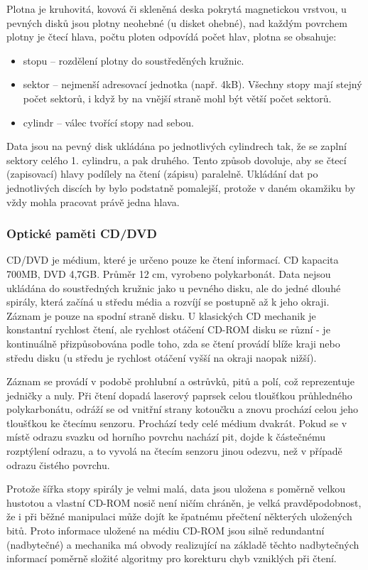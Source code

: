 Plotna je kruhovitá, kovová či skleněná deska pokrytá magnetickou vrstvou, u pevných disků jsou plotny neohebné (u disket ohebné), nad každým povrchem plotny je čtecí hlava, počtu ploten odpovídá počet hlav, plotna se obsahuje:
\begin{itemize}
\item stopu -- rozdělení plotny do soustředěných kružnic.
\item sektor -- nejmenší adresovací jednotka (např. 4kB). Všechny stopy mají stejný počet sektorů, i když by na vnější straně mohl být větší počet sektorů.
\item cylindr -- válec tvořící stopy nad sebou.
\end{itemize}

Data jsou na pevný disk ukládána po jednotlivých cylindrech tak, že se zaplní sektory celého 1. cylindru, a pak druhého. Tento způsob dovoluje, aby se čtecí (zapisovací) hlavy podílely na čtení (zápisu) paralelně. Ukládání dat po jednotlivých discích by bylo podstatně pomalejší, protože v daném okamžiku by vždy mohla pracovat právě jedna hlava.

\subsubsection{Optické paměti CD/DVD}
CD/DVD je médium, které je určeno pouze ke čtení informací. CD kapacita 700MB, DVD 4,7GB. Průměr 12 cm, vyrobeno polykarbonát. Data nejsou ukládána do soustředných kružnic jako u pevného disku, ale do jedné dlouhé spirály, která začíná u středu média a rozvíjí se postupně až k jeho okraji.
Záznam je pouze na spodní straně disku. U klasických CD mechanik je konstantní rychlost čtení, ale rychlost otáčení CD-ROM disku se různí - je kontinuálně přizpůsobována podle toho, zda se čtení provádí blíže kraji nebo středu disku (u středu je rychlost otáčení vyšší na okraji naopak nižší).

Záznam se provádí v podobě prohlubní a ostrůvků, pitů a polí, což reprezentuje jedničky a nuly. Při čtení dopadá laserový paprsek celou tloušťkou průhledného polykarbonátu, odráží se od vnitřní strany kotoučku a znovu prochází celou jeho tloušťkou ke čtecímu senzoru. Prochází tedy celé médium dvakrát. Pokud se v místě odrazu svazku od horního povrchu nachází pit, dojde k částečnému rozptýlení odrazu, a to vyvolá na čtecím senzoru jinou odezvu, než v případě odrazu čistého povrchu.
 
Protože šířka stopy spirály je velmi malá, data jsou uložena s poměrně velkou hustotou a vlastní CD-ROM nosič není ničím chráněn, je velká pravděpodobnost, že i při běžné manipulaci může dojít ke špatnému přečtení některých uložených bitů. Proto informace uložené na médiu CD-ROM jsou silně redundantní (nadbytečné) a mechanika má obvody realizující na základě těchto nadbytečných informací poměrně složité algoritmy pro korekturu chyb vzniklých při čtení.

